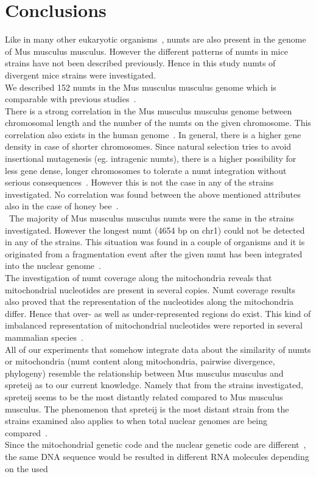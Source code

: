 \documentclass[a4paper,12pt]{article}
\numberwithin{equation}{section} %
\begin{document}
\section{Conclusions}
\indent Like in many other eukaryotic organisms~, numts are also present in the genome of Mus musculus musculus. However the different patterns of numts in mice strains have not been described previously. Hence in this study numts of  divergent mice strains were investigated.\\ \indent We described 152 numts in the Mus musculus musculus genome which is comparable with previous studies~.\\ \indent There is a strong correlation in the Mus musculus musculus genome between chromosomal length and the number of the numts on the given chromosome. This correlation also exists in the human genome~. In general, there is a higher gene density in case of shorter chromosomes. Since natural selection tries to avoid insertional mutagenesis (eg. intragenic numts), there is a higher possibility for less gene dense, longer chromosomes to tolerate a numt integration without serious consequences~. However this is not the case in any of the strains investigated. No correlation was found between the above mentioned attributes also in the case of honey bee~. \\ \indent The majority of Mus musculus musculus numts were the same in the strains investigated. However the longest numt (4654 bp on chr1) could not be detected in any of the strains. This situation was found in a couple of organisms and it is originated from a fragmentation event after the given numt has been integrated into the nuclear genome~.\\ \indent The investigation of numt coverage along the mitochondria reveals that mitochondrial nucleotides are present in several copies. Numt coverage results also proved that the representation of the nucleotides along the mitochondria differ. Hence that over- as well as under-represented regions do exist. This kind of imbalanced representation of mitochondrial nucleotides were reported in several mammalian species~.\\ \indent All of our experiments that somehow integrate data about the similarity of numts or mitochondria (numt content along mitochondria, pairwise divergence, phylogeny) resemble the relationship between Mus musculus musculus and spreteij as to our current knowledge. Namely that from the strains investigated, spreteij seems to be the most distantly related compared to Mus musculus musculus. The phenomenon that spreteij is the most distant strain from the strains examined also applies to when total nuclear genomes are being compared~.\\ \indent Since the mitochondrial genetic code and the nuclear genetic code are different~, the same DNA sequence would be resulted in different RNA molecules depending on the used 
\end{document}

